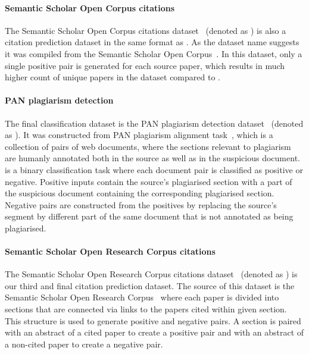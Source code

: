 \paragraph{Semantic Scholar Open Corpus citations} The Semantic Scholar Open
Corpus citations dataset~\citep{zhou2020multilevel} (denoted as ) is
also a citation prediction dataset in the same format as . As the
dataset name suggests it was compiled from the Semantic Scholar Open
Corpus~\citep{bhagavatula2018content}. In this dataset, only a single positive
pair is generated for each source paper, which results in much higher count of
unique papers in the dataset compared to .

\paragraph{PAN plagiarism detection} The final classification dataset is the
PAN plagiarism detection dataset~\citep{zhou2020multilevel} (denoted as
). It was constructed from PAN plagiarism alignment
task~\citep{potthast2013overview}, which is a collection of pairs of web
documents, where the sections relevant to plagiarism are humanly annotated both
in the source as well as in the suspicious document.  is a binary
classification task where each document pair is classified as positive or
negative. Positive inputs contain the source's plagiarised section with a part of
the suspicious document containing the corresponding plagiarised section.
Negative pairs are constructed from the positives by replacing the source's
segment by different part of the same document that is not annotated as being
plagiarised.

\paragraph{Semantic Scholar Open Research Corpus citations} The Semantic
Scholar Open Research Corpus citations dataset~\citep{zhou2020multilevel}
(denoted as ) is our third and final citation prediction dataset.
The source of this dataset is the Semantic Scholar Open Research
Corpus~\citep{lo2019s2orc} where each paper is divided into sections that are
connected via links to the papers cited within given section. This structure is
used to generate positive and negative pairs. A section is paired with an
abstract of a cited paper to create a positive pair and with an abstract of
a non-cited paper to create a negative pair.


